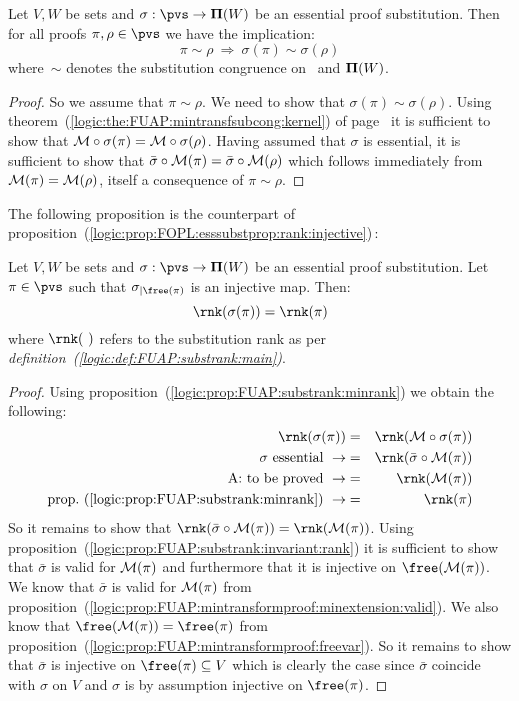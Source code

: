 \begin{prop}\label{logic:prop:FUAP:esssubstprop:equivalence}
Let $V,W$ be sets and $\sigma:\pvs\to {\bf\Pi}(W)$ be an essential
proof substitution. Then for all proofs $\pi,\rho\in\pvs$ we have
the implication:
    \[
    \pi\sim\rho\ \Rightarrow\ \sigma(\pi)\sim\sigma(\rho)
    \]
where~$\sim$ denotes the substitution congruence on \pvs\ and ${\bf
\Pi}(W)$.
\end{prop}
\begin{proof}
So we assume that $\pi\sim\rho$. We need to show that
$\sigma(\pi)\sim\sigma(\rho)$. Using
theorem~(\ref{logic:the:FUAP:mintransfsubcong:kernel}) of
page~\pageref{logic:the:FUAP:mintransfsubcong:kernel} it is
sufficient to show that ${\cal M}\circ\sigma(\pi)={\cal
M}\circ\sigma(\rho)$. Having assumed that $\sigma$ is essential, it
is sufficient to show that $\bar{\sigma}\circ{\cal
M}(\pi)=\bar{\sigma}\circ{\cal M}(\rho)$ which follows immediately
from ${\cal M}(\pi)={\cal M}(\rho)$, itself a consequence of
$\pi\sim\rho$.
\end{proof}

The following proposition is the counterpart of
proposition~(\ref{logic:prop:FOPL:esssubstprop:rank:injective})\,:

\begin{prop}\label{logic:prop:FUAP:esssubstprop:rank:injective}
Let $V,W$ be sets and $\sigma:\pvs\to{\bf\Pi}(W)$ be an essential
proof substitution. Let $\pi\in\pvs$ such that
$\sigma_{|\free(\pi)}$ is an injective map. Then:
    \[
    \rnk(\sigma(\pi))=\rnk(\pi)
    \]
where $\rnk(\,\,)$ refers to the substitution rank as per {\em
definition~(\ref{logic:def:FUAP:substrank:main})}.
\end{prop}
\begin{proof}
Using proposition~(\ref{logic:prop:FUAP:substrank:minrank}) we
obtain the following:
    \begin{eqnarray*}
    \rnk(\sigma(\pi))&=&\rnk({\cal M}\circ\sigma(\pi))\\
    \mbox{$\sigma$ essential}\ \rightarrow
    &=&\rnk(\bar{\sigma}\circ{\cal M}(\pi))\\
    \mbox{A: to be proved}\ \rightarrow
    &=&\rnk({\cal M}(\pi))\\
    \mbox{prop.~(\ref{logic:prop:FUAP:substrank:minrank})}\ \rightarrow
    &=&\rnk(\pi)
    \end{eqnarray*}
So it remains to show that $\rnk(\bar{\sigma}\circ{\cal
M}(\pi))=\rnk({\cal M}(\pi))$. Using
proposition~(\ref{logic:prop:FUAP:substrank:invariant:rank}) it is
sufficient to show that $\bar{\sigma}$ is valid for ${\cal M}(\pi)$
and furthermore that it is injective on $\free({\cal M}(\pi))$. We
know that $\bar{\sigma}$ is valid for ${\cal M}(\pi)$ from
proposition~(\ref{logic:prop:FUAP:mintransformproof:minextension:valid}).
We also know that $\free({\cal M}(\pi))=\free(\pi)$ from
proposition~(\ref{logic:prop:FUAP:mintransformproof:freevar}). So it
remains to show that $\bar{\sigma}$ is injective on
$\free(\pi)\subseteq V$ which is clearly the case since
$\bar{\sigma}$ coincide with $\sigma$ on $V$ and $\sigma$ is by
assumption injective on $\free(\pi)$.
\end{proof}

